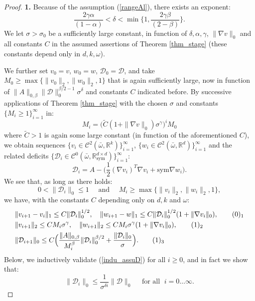\documentclass[reqno,twoside,11pt]{amsart}
\newcommand{\sym}{\mathrm{sym}}
\newcommand{\R}{\mathbb{R}}
\numberwithin{equation}{section}
\theoremstyle{plain}
\theoremstyle{definition}
\begin{document}
\begin{proof}
{\bf 1.} Because of the assumption (\ref{rangeAl}), there exists an exponent:
\begin{equation}\label{exp_del}
\frac{2\gamma\alpha}{(1-\alpha)}< \delta < \min\Big\{1,\frac{2\gamma\beta}{(2-\beta)}\Big\}.
\end{equation} 
We let $\sigma >\sigma_0$ be a sufficiently large constant, in function of
$\delta,\alpha,\gamma$, $\|\nabla v\|_0$ and 
all constants $C$ in the assumed assertions of Theorem
\ref{thm_stage} (these constants depend only in $d,k, \omega$). 

We further set $v_0=v$, $w_0=w$, $\mathcal{D}_0=\mathcal{D}$, and take $M_0\geq \max\{\|v_0\|_2,
\|w_0\|_2,1\}$ that is again sufficiently large, now in function of
$\|A\|_{0,\beta}\|\mathcal{D}\|_0^{\beta/2-1} \sigma^\delta$ and
constants $C$ indicated before.
By successive applications of Theorem \ref{thm_stage} with the chosen $\sigma$ 
and constants $\{M_i\geq 1\}_{i=1}^\infty$ in:
$$M_i = \Big(\tilde C (1+\|\nabla v\|_0) \sigma^\gamma\Big)^iM_0$$
where $\tilde C>1$ is again some large constant (in function of
the aforementioned $C$),
we obtain sequences $\{v_i\in \mathcal{C}^2(\bar\omega,\R^k)\}_{i=1}^\infty$, 
$\{w_i\in\mathcal{C}^2(\bar\omega,\R^d)\}_{i=1}^\infty$ and the related
deficits $\{\mathcal{D}_i \in \mathcal{C}^0(\bar\omega,\R^{d\times d}_\sym)\}_{i=1}^\infty$:
$$\mathcal{D}_i = A-\big(\frac{1}{2}(\nabla v_i)^T\nabla v_i + \sym\nabla w_i\big).$$
We see that, as long as there holds:
\begin{equation}\label{indu_assuD}
0<\|\mathcal{D}_i\|_0\leq 1 \quad \mbox{ and }\quad M_i\geq \max\{\|v_i\|_2,\|w_i\|_2,1\},
\end{equation}
we have, with the constants $C$ depending only on $d, k$ and $\omega$:
\begin{align*}
& \|v_{i+1} - v_i\|_1\leq C\|\mathcal{D}_i\|_0^{1/2}, \quad \|w_{i+1} -
w\|_1\leq C\|\mathcal{D}_i\|_0^{1/2}(1+\|\nabla v_i\|_0),
\tag*{(\theequation)$_1$}\refstepcounter{equation} \label{Bbound1}\vspace{1mm}\\
& \|v_{i+1}\|_2\leq CM_i\sigma^\gamma,\quad \|w_{i+1}\|_2\leq CM_i\sigma^\gamma(1+\|\nabla v_i\|_0),
\tag*{(\theequation)$_2$}\label{Bbound2} \\ 
& \|{\mathcal{D}}_{i+1}\|_0\leq C\Big(\frac{\|A\|_{0,\beta}}{M_i^\beta} \|\mathcal{D}_i\|_0^{\beta/2} +
\frac{\|\mathcal{D}_i\|_0}{\sigma}\Big). \tag*{(\theequation)$_3$} \label{Bbound3}
\end{align*}
Below, we inductively validate  (\ref{indu_assuD}) for all $i\geq 0$,
and in fact we show that:
\begin{equation}\label{import_bd}
\|\mathcal{D}_i\|_0\leq \frac{1}{\sigma^{\delta i}}\|\mathcal{D}\|_0\quad
\mbox{ for all } \; i=0\ldots\infty.
\end{equation}


\end{proof}
\end{document}
